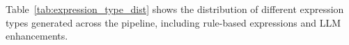 Table~\ref{tab:expression_type_dist} shows the distribution of different expression types generated across the pipeline, including rule-based expressions and LLM enhancements.

\begin{table}[H]
\centering
\caption{Expression Type Distribution}
\label{tab:expression_type_dist}
\end{table}
